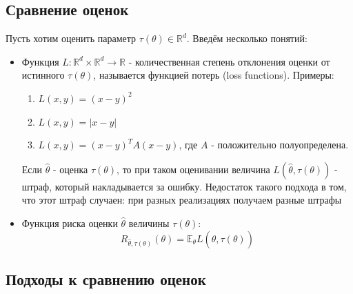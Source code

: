 \documentclass[a4paper,12pt]{article}
\newcommand{\expec}{\mathbb{E}}
\newcommand{\R}{\mathbb{R}}
\theoremstyle{named}
\begin{document}
\subsection{Сравнение оценок}
Пусть хотим оценить параметр $\tau(\theta) \in \R^d$. Введём несколько понятий:
\begin{itemize}
    \item Функция $L: \R^d \times \R^d \to \R$ - количественная степень отклонения оценки от истинного $\tau(\theta)$, называется 
    функцией потерь (loss functions). Примеры:
    \begin{enumerate}
        \item $L(x, y) = (x-y)^2$
        \item $L(x, y) = |x - y|$
        \item $L(x, y) = (x-y)^TA(x-y)$, где $A$ - положительно полуопределена.
    \end{enumerate} 
    Если $\hat\theta$ - оценка $\tau(\theta)$, то при таком оценивании величина $L(\hat\theta, \tau(\theta))$ - штраф, который накладывается 
    за ошибку. Недостаток такого подхода в том, что этот штраф случаен: при разных реализациях получаем разные штрафы
    \item Функция риска оценки $\hat\theta$ величины $\tau(\theta)$:
    $$
        R_{\hat\theta, \tau(\theta)}(\theta) = \expec_\theta L(\hat\theta, \tau(\theta))
    $$
\end{itemize}
\subsection*{Подходы к сравнению оценок}
\end{document}
